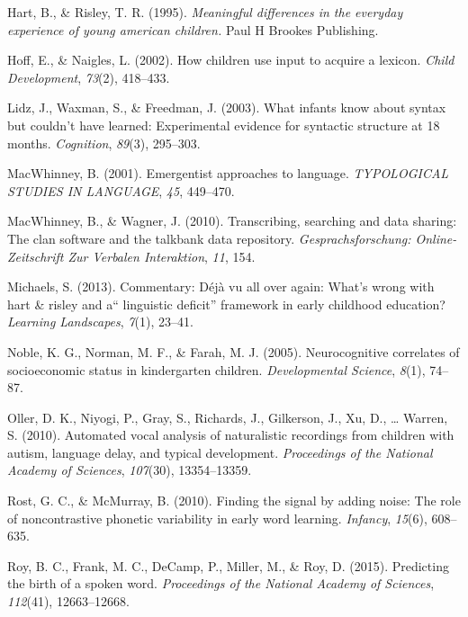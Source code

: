 \documentclass[floatsintext,man]{apa6}
\theoremstyle{definition}
\theoremstyle{definition}
\theoremstyle{definition}
\theoremstyle{remark}
\begin{document}
\hypertarget{ref-hart1995meaningful}{}
Hart, B., \& Risley, T. R. (1995). \emph{Meaningful differences in the
everyday experience of young american children.} Paul H Brookes
Publishing.

\hypertarget{ref-hoff2002children}{}
Hoff, E., \& Naigles, L. (2002). How children use input to acquire a
lexicon. \emph{Child Development}, \emph{73}(2), 418--433.

\hypertarget{ref-lidz2003infants}{}
Lidz, J., Waxman, S., \& Freedman, J. (2003). What infants know about
syntax but couldn't have learned: Experimental evidence for syntactic
structure at 18 months. \emph{Cognition}, \emph{89}(3), 295--303.

\hypertarget{ref-macwhinney2001emergentist}{}
MacWhinney, B. (2001). Emergentist approaches to language.
\emph{TYPOLOGICAL STUDIES IN LANGUAGE}, \emph{45}, 449--470.

\hypertarget{ref-macwhinney2010transcribing}{}
MacWhinney, B., \& Wagner, J. (2010). Transcribing, searching and data
sharing: The clan software and the talkbank data repository.
\emph{Gesprachsforschung: Online-Zeitschrift Zur Verbalen Interaktion},
\emph{11}, 154.

\hypertarget{ref-michaels2013commentary}{}
Michaels, S. (2013). Commentary: Déjà vu all over again: What's wrong
with hart \& risley and a`` linguistic deficit'' framework in early
childhood education? \emph{Learning Landscapes}, \emph{7}(1), 23--41.

\hypertarget{ref-noble2005neurocognitive}{}
Noble, K. G., Norman, M. F., \& Farah, M. J. (2005). Neurocognitive
correlates of socioeconomic status in kindergarten children.
\emph{Developmental Science}, \emph{8}(1), 74--87.

\hypertarget{ref-oller2010automated}{}
Oller, D. K., Niyogi, P., Gray, S., Richards, J., Gilkerson, J., Xu, D.,
\ldots{} Warren, S. (2010). Automated vocal analysis of naturalistic
recordings from children with autism, language delay, and typical
development. \emph{Proceedings of the National Academy of Sciences},
\emph{107}(30), 13354--13359.

\hypertarget{ref-rost2010finding}{}
Rost, G. C., \& McMurray, B. (2010). Finding the signal by adding noise:
The role of noncontrastive phonetic variability in early word learning.
\emph{Infancy}, \emph{15}(6), 608--635.

\hypertarget{ref-roy2015predicting}{}
Roy, B. C., Frank, M. C., DeCamp, P., Miller, M., \& Roy, D. (2015).
Predicting the birth of a spoken word. \emph{Proceedings of the National
Academy of Sciences}, \emph{112}(41), 12663--12668.
\end{document}
